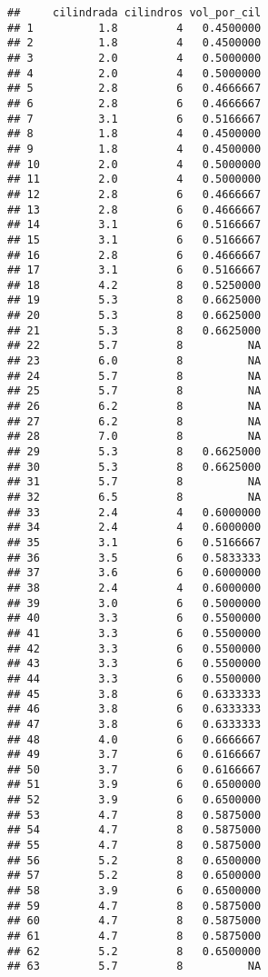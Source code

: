 \documentclass[]{article}
\begin{document}
\begin{verbatim}
##     cilindrada cilindros vol_por_cil
## 1          1.8         4   0.4500000
## 2          1.8         4   0.4500000
## 3          2.0         4   0.5000000
## 4          2.0         4   0.5000000
## 5          2.8         6   0.4666667
## 6          2.8         6   0.4666667
## 7          3.1         6   0.5166667
## 8          1.8         4   0.4500000
## 9          1.8         4   0.4500000
## 10         2.0         4   0.5000000
## 11         2.0         4   0.5000000
## 12         2.8         6   0.4666667
## 13         2.8         6   0.4666667
## 14         3.1         6   0.5166667
## 15         3.1         6   0.5166667
## 16         2.8         6   0.4666667
## 17         3.1         6   0.5166667
## 18         4.2         8   0.5250000
## 19         5.3         8   0.6625000
## 20         5.3         8   0.6625000
## 21         5.3         8   0.6625000
## 22         5.7         8          NA
## 23         6.0         8          NA
## 24         5.7         8          NA
## 25         5.7         8          NA
## 26         6.2         8          NA
## 27         6.2         8          NA
## 28         7.0         8          NA
## 29         5.3         8   0.6625000
## 30         5.3         8   0.6625000
## 31         5.7         8          NA
## 32         6.5         8          NA
## 33         2.4         4   0.6000000
## 34         2.4         4   0.6000000
## 35         3.1         6   0.5166667
## 36         3.5         6   0.5833333
## 37         3.6         6   0.6000000
## 38         2.4         4   0.6000000
## 39         3.0         6   0.5000000
## 40         3.3         6   0.5500000
## 41         3.3         6   0.5500000
## 42         3.3         6   0.5500000
## 43         3.3         6   0.5500000
## 44         3.3         6   0.5500000
## 45         3.8         6   0.6333333
## 46         3.8         6   0.6333333
## 47         3.8         6   0.6333333
## 48         4.0         6   0.6666667
## 49         3.7         6   0.6166667
## 50         3.7         6   0.6166667
## 51         3.9         6   0.6500000
## 52         3.9         6   0.6500000
## 53         4.7         8   0.5875000
## 54         4.7         8   0.5875000
## 55         4.7         8   0.5875000
## 56         5.2         8   0.6500000
## 57         5.2         8   0.6500000
## 58         3.9         6   0.6500000
## 59         4.7         8   0.5875000
## 60         4.7         8   0.5875000
## 61         4.7         8   0.5875000
## 62         5.2         8   0.6500000
## 63         5.7         8          NA

\end{verbatim}
\end{document}
